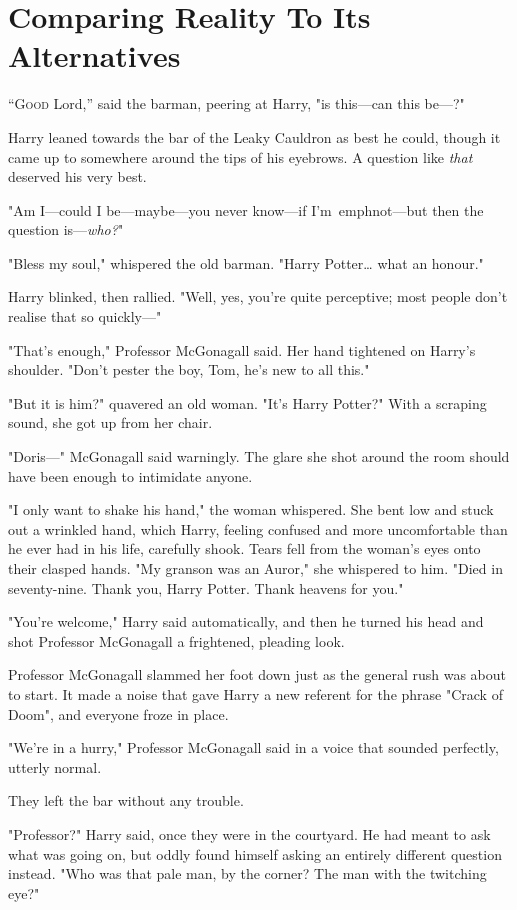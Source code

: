 \chapter{Comparing Reality To Its Alternatives}

\lettrine{“G}{ood} Lord,'' said the barman, peering at Harry, "is this---can this be---?"

Harry leaned towards the bar of the Leaky Cauldron as best he could, though it 
came up to somewhere around the tips of his eyebrows. A question like 
\emph{that} deserved his very best.

"Am I---could I be---maybe---you never know---if I'm\ emph{not}---but then the 
question is---\emph{who?}"

"Bless my soul," whispered the old barman. "Harry Potter{\ldots} what an 
honour."

Harry blinked, then rallied. "Well, yes, you're quite perceptive; most people 
don't realise that so quickly---"

"That's enough," Professor McGonagall said. Her hand tightened on Harry's 
shoulder. "Don't pester the boy, Tom, he's new to all this."

"But it is him?" quavered an old woman. "It's Harry Potter?" With a scraping 
sound, she got up from her chair.

"Doris---" McGonagall said warningly. The glare she shot around the room should 
have been enough to intimidate anyone.

"I only want to shake his hand," the woman whispered. She bent low and stuck 
out a wrinkled hand, which Harry, feeling confused and more uncomfortable than 
he ever had in his life, carefully shook. Tears fell from the woman's eyes onto 
their clasped hands. "My granson was an Auror," she whispered to him. "Died in 
seventy-nine. Thank you, Harry Potter. Thank heavens for you."

"You're welcome," Harry said automatically, and then he turned his head and 
shot Professor McGonagall a frightened, pleading look.

Professor McGonagall slammed her foot down just as the general rush was about 
to start. It made a noise that gave Harry a new referent for the phrase "Crack 
of Doom", and everyone froze in place.

"We're in a hurry," Professor McGonagall said in a voice that sounded 
perfectly, utterly normal.

They left the bar without any trouble.

"Professor?" Harry said, once they were in the courtyard. He had meant to ask 
what was going on, but oddly found himself asking an entirely different 
question instead. "Who was that pale man, by the corner? The man with the 
twitching eye?"

